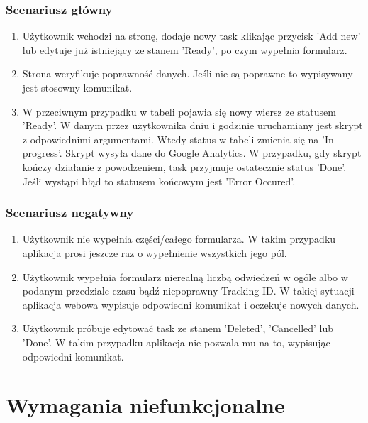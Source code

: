 \documentclass{article}
\begin{document}
    \subsubsection{Scenariusz główny}
    \begin{enumerate}
    \item Użytkownik wchodzi na stronę, dodaje nowy task klikając przycisk 'Add new' lub edytuje już istniejący ze stanem 'Ready', po czym wypełnia formularz.

    \item Strona weryfikuje poprawność danych. Jeśli nie są poprawne to wypisywany jest stosowny komunikat.

    \item W przeciwnym przypadku w tabeli pojawia się nowy wiersz ze statusem 'Ready'. W danym przez użytkownika dniu i godzinie uruchamiany jest skrypt z odpowiednimi argumentami. Wtedy status  w tabeli zmienia się na 'In progress'. Skrypt wysyła dane do Google Analytics. W przypadku, gdy skrypt kończy działanie z powodzeniem, task przyjmuje ostatecznie status 'Done'. Jeśli wystąpi błąd to statusem końcowym jest 'Error Occured'.
    \end{enumerate}
    
    \subsubsection{Scenariusz negatywny}
    \begin{enumerate}

    \item Użytkownik nie wypełnia części/całego formularza. W takim przypadku aplikacja prosi jeszcze raz o wypełnienie wszystkich jego pól.
    
    \item Użytkownik wypełnia formularz nierealną liczbą odwiedzeń w ogóle albo w podanym przedziale czasu bądź niepoprawny Tracking ID\@. W takiej sytuacji aplikacja webowa wypisuje odpowiedni komunikat i oczekuje nowych danych.
    
    \item Użytkownik próbuje edytować task ze stanem 'Deleted', 'Cancelled' lub 'Done'. W takim przypadku aplikacja nie pozwala mu na to, wypisując odpowiedni komunikat.
    
    
    \end{enumerate}
    
    \section{Wymagania niefunkcjonalne}
    
\end{document}
